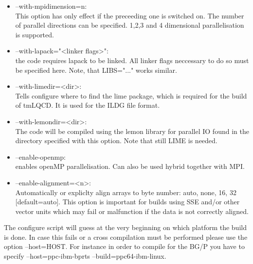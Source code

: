 \begin{itemize}

\item {\ttfamily --with-mpidimension=n}:\\
  This option has only effect if the preceeding one is switched
  on. The number of parallel directions can be specified. 1,2,3 and 4
  dimensional parallelisation is supported.

\item {\ttfamily --with-lapack="<linker flags>"}:\\
  the code requires lapack to be linked. All linker flags neccessary
  to do so must be specified here. Note, that {\ttfamily LIBS="..."}
  works similar.

\item {\ttfamily --with-limedir=<dir>}:\\
  Tells configure where to find the lime package, which is required for
  the build of tmLQCD. It is used for the ILDG file format.
 
\item {\ttfamily --with-lemondir=<dir>}:\\
  The code will be compiled using the lemon library for parallel IO
  found in the directory specified with this option. Note that still
  LIME is needed.

\item {\ttfamily --enable-openmp}:\\
  enables openMP parallelisation. Can also be used hybrid together
  with MPI.

\item {\ttfamily --enable-alignment=<n>}:\\
  Automatically or expliclty align arrays to byte number: auto, none,
  16, 32 [default=auto]. This option is important for builds using SSE
  and/or other vector units which may fail or malfunction if the data
  is not correctly aligned.

\end{itemize}

The configure script will guess at the very beginning on which
platform the build is done. In case this fails or a cross compilation
must be performed please use the option {\ttfamily --host=HOST}. For
instance in order to compile for the BG/P you have to specify
{\ttfamily --host=ppc-ibm-bprts --build=ppc64-ibm-linux}. 

